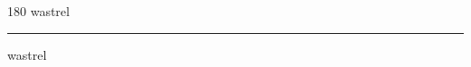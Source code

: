 
\begin{frame}
\begin{center}
\begin{turn}{180}
{\fontsize{2.5cm}{1em}\selectfont wastrel}
\end{turn}
\vspace{1em}\par  
\hrule
\vspace{1em}\par  
{\fontsize{2.5cm}{1em}\selectfont wastrel}
\end{center}
\end{frame}
